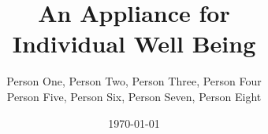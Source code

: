 \documentclass[11pt,letterpaper,oneside]{memoir}
\title{An Appliance for\\
Individual Well Being}
\author{  
    Person One, Person Two, Person Three, Person Four\\
    Person Five, Person Six, Person Seven, Person Eight\\
    } %
\date{\today}
\begin{document}
\begin{figure}[t]
\centering
\end{figure}

\titlep

%

\renewcommand{\chaptitlefont}{\normalfont\Large\bfseries}
\newpage
\tableofcontents*  %

\newpage
\listoffigures*  %

\renewcommand{\chaptitlefont}{\normalfont\Huge\bfseries}

\newpage
\end{document}
